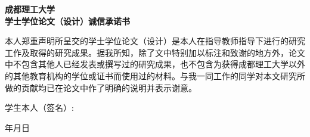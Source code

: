   \let\cleardoublepage\clearpage
  \null
  \thispagestyle{empty}
  \vspace*{44pt}
  \begin{center}{\hei {} \textbf{成都理工大学\\
  \vspace{1cm}学士学位论文（设计）诚信承诺书}}\end{center}
  \par\vspace*{40pt}
  \setlength{\baselineskip}{23pt}
  {
  本人郑重声明所呈交的学士学位论文（设计）是本人在指导教师指导下进行的研究工作及取得的研究成果。据我所知，除了文中特别加以标注和致谢的地方外，论文中不包含其他人已经发表或撰写过的研究成果，也不包含为获得成都理工大学以外的其他教育机构的学位或证书而使用过的材料。与我一同工作的同学对本文研究所做的贡献均已在论文中作了明确的说明并表示谢意。
  \par \vspace*{88pt}
  \hfill \hei {} 学生本人（签名）: \hspace{3.5cm}\hfill \par
  \hfill \hei {} 年\hspace{1cm}月\hspace{1cm}日
  }
